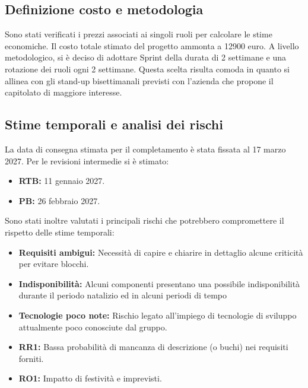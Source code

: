\documentclass[a4paper, 11pt]{article}
\begin{document}
\subsection{Definizione costo e metodologia}
Sono stati verificati i prezzi associati ai singoli ruoli per calcolare le stime economiche. Il costo totale stimato del progetto ammonta a 12900 euro. A livello metodologico, si è deciso di adottare Sprint della durata di 2 settimane e una rotazione dei ruoli ogni 2 settimane. Questa scelta risulta comoda in quanto si allinea con gli stand-up bisettimanali previsti con l'azienda che propone il capitolato di maggiore interesse.

\subsection{Stime temporali e analisi dei rischi}
La data di consegna stimata per il completamento è stata fissata al 17 marzo 2027.
Per le revisioni intermedie si è stimato:
\begin{itemize}
    \item \textbf{RTB:} 11 gennaio 2027.
    \item \textbf{PB:} 26 febbraio 2027.
\end{itemize}
Sono stati inoltre valutati i principali rischi che potrebbero compromettere il rispetto delle stime temporali:
\begin{itemize}
    \item \textbf{Requisiti ambigui:} Necessità di capire e chiarire in dettaglio alcune criticità per evitare blocchi.
    \item \textbf{Indisponibilità:} Alcuni componenti presentano una possibile indisponibilità durante il periodo natalizio ed in alcuni periodi di tempo
    \item \textbf{Tecnologie poco note:} Rischio legato all'impiego di tecnologie di sviluppo attualmente poco conosciute dal gruppo.
    \item \textbf{RR1:} Bassa probabilità di mancanza di descrizione (o buchi) nei requisiti forniti.
    \item \textbf{RO1:} Impatto di festività e imprevisti.
\end{itemize}
\end{document}

